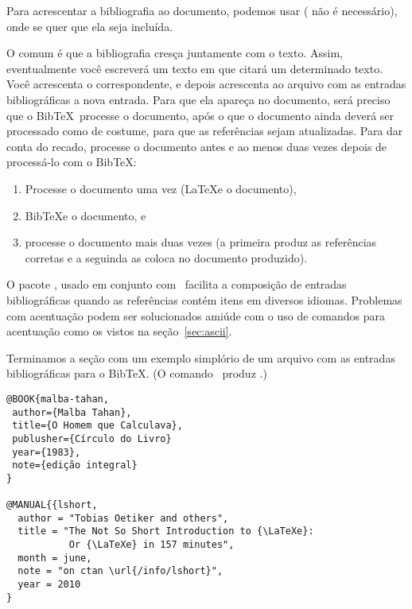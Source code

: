 Para acrescentar a bibliografia ao documento, podemos usar 
 ( não é
necessário), onde se quer que ela seja incluída. 

O comum é que a bibliografia cresça juntamente com o texto. Assim,
eventualmente você escreverá um texto em que citará um determinado
texto. Você acrescenta o  correspondente, e depois
acrescenta ao arquivo com as entradas bibliográficas a nova
entrada. Para que ela apareça no documento, será preciso que o
Bib\TeX\ processe o documento, após o que o documento ainda deverá ser
processado como de costume, para que as referências sejam
atualizadas. Para dar conta do recado, processe o documento antes e
ao menos duas vezes depois de processá-lo com o Bib\TeX:
\begin{enumerate}
\item Processe o documento uma vez (\LaTeX e o documento),
\item Bib\TeX e o documento, e
\item processe o documento mais duas vezes (a primeira produz as
  referências corretas e a seguinda as coloca no documento produzido).
\end{enumerate}

O pacote , usado em conjunto com~
facilita a composição de entradas bibliográficas quando as referências
contém itens em diversos idiomas. Problemas com acentuação podem ser
solucionados amiúde com o uso de comandos para acentuação como os
vistos na seção~\ref{sec:ascii}. 

Terminamos a seção com um exemplo simplório de um arquivo com as
entradas bibliográficas para o Bib\TeX. (O comando~
produz \LaTeXe.)

\begin{verbatim}
@BOOK{malba-tahan,
 author={Malba Tahan},
 title={O Homem que Calculava},
 publusher={Círculo do Livro}
 year={1983},
 note={edição integral}
}

@MANUAL{{lshort,
  author = "Tobias Oetiker and others",
  title = "The Not So Short Introduction to {\LaTeXe}:
           Or {\LaTeXe} in 157 minutes",
  month = june,
  note = "on ctan \url{/info/lshort}",
  year = 2010
}
\end{verbatim}

